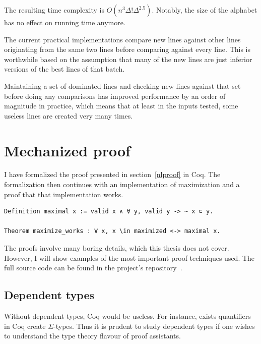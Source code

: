 \documentclass[english, 12pt, a4paper, sci, a-1b, online]{aaltothesis}
\begin{document}
The resulting time complexity is $O(n^{3}\Delta!\Delta^{2.5})$. Notably, the size of the alphabet has no effect on running time anymore.

The current practical implementations compare new lines against other lines originating from the same two lines before comparing against every line. This is worthwhile based on the assumption that many of the new lines are just inferior versions of the best lines of that batch.

Maintaining a set of dominated lines and checking new lines against that set before doing any comparisons has improved performance by an order of magnitude in practice, which means that at least in the inputs tested, some useless lines are created very many times.


\section{Mechanized proof}\label{mechproof}

I have formalized the proof presented in section~\ref{nlproof} in Coq. The formalization then continues with an implementation of maximization and a proof that that implementation works.

\begin{listing}[h]
\begin{verbatim}
Definition maximal x := valid x ∧ ∀ y, valid y -> ~ x ⊂ y.

Theorem maximize_works : ∀ x, x \in maximized <-> maximal x.
\end{verbatim}
\caption{The final theorem that states that a line is in the result of maximization if and only if it is maximal.}
\end{listing}

The proofs involve many boring details, which this thesis does not cover. However, I will show examples of the most important proof techniques used. The full source code can be found in the project's repository~\cite{source_code}.

\subsection{Dependent types}\label{dependent}

Without dependent types, Coq would be useless. For instance, exists quantifiers in Coq create $\Sigma$-types. Thus it is prudent to study dependent types if one wishes to understand the type theory flavour of proof assistants.
\end{document}
